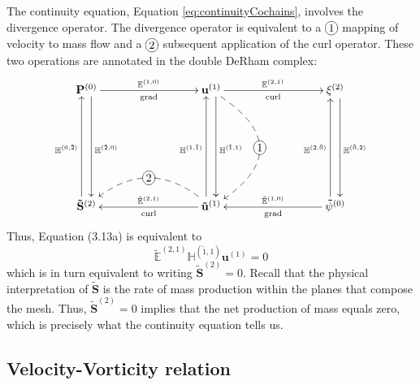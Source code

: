 The continuity equation, Equation \eqref{eq:continuityCochains}, involves the divergence operator. The divergence operator is equivalent to a $\xymatrix{*+[o][F-]{1}}$ mapping of velocity to mass flow and a $\xymatrix{*+[o][F-]{2}}$ subsequent application of the curl operator. These two operations are annotated in the double DeRham complex: 
\begin{equation}
    \begin{gathered}
        \xymatrix@=20ex{
            \mathbf{P}^{(0)} \ar[r]^{\mathbb{E}^{(1,0)}}_{\text{grad}} \ar@<1ex>[d]^{\mathbb{H}^{(\tilde{2},0)}} & \mathbf{u}^{(1)} \ar[r]^{\mathbb{E}^{(2,1)}}_{\text{curl}} \ar @/^10ex/ @{-->} [d]|-*+[o][F-]{1} \ar@<1ex>[d]^{\mathbb{H}^{(\tilde{1},1)}} & \mathbf{\xi}^{(2)} \ar@<1ex>[d]^{\mathbb{H}^{(\tilde{0},2)}} \\
            \mathbf{\tilde{S}}^{(2)} \ar@<1ex>[u]^{\mathbb{H}^{(0,\tilde{2})}} & \mathbf{\tilde{u}}^{(1)} \ar[l]_{\tilde{\mathbb{E}}^{(2, 1)}}^{\text{curl}} \ar @/_6ex/ @{-->} [l]|-*+[o][F-]{2} \ar@<1ex>[u]^{\mathbb{H}^{(1,\tilde{1})}} & \mathbf{\tilde{\psi}}^{(0)} \ar[l]_{\tilde{\mathbb{E}}^{(1,0)}}^{\text{grad}} \ar@<1ex>[u]^{\mathbb{H}^{(2,\tilde{0})}}
        }
    \end{gathered}
    \label{eq:DeRhamMassConservation}
\end{equation}
Thus, Equation (3.13a) is equivalent to
\begin{equation}
    \tilde{\mathbb{E}}^{(2,1)} \mathbb{H}^{(\tilde{1},1)} \mathbf{u}^{(1)} = 0
\end{equation}
which is in turn equivalent to writing $\mathbf{\tilde{S}}^{(2)} = 0$. Recall that the physical interpretation of $\mathbf{\tilde{S}}$ is the rate of mass production within the planes that compose the mesh. Thus, $\mathbf{\tilde{S}}^{(2)} = 0$ implies that the net production of mass equals zero, which is precisely what the continuity equation tells us.

\subsection{Velocity-Vorticity relation}

